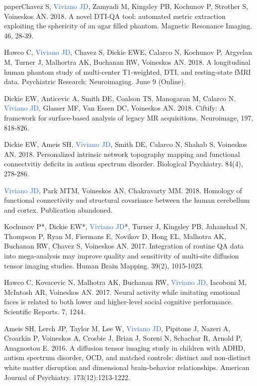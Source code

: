 \documentclass[a4paper,11pt,oneside]{book}
\newcommand\paper[1]{
    #1\\
    \vspace{3.5mm}
}
\begin{document}
\begin{flushleft}
paper{Chavez S, \textcolor{highlight}{Viviano JD}, Zamyadi M, Kingsley PB, Kochunov P, Strother S, Voineskos AN. 2018. A novel DTI-QA tool: automated metric extraction exploiting the sphericity of an agar filled phantom. Magnetic Resonance Imaging. 46, 28-39.}

\paper{Hawco C, \textcolor{highlight}{Viviano JD}, Chavez S, Dickie EWE, Calarco N, Kochunov P, Argyelan M, Turner J, Malhortra AK, Buchanan RW, Voineskos AN. 2018. A longitudinal human phantom study of multi-center T1-weighted, DTI, and resting-state fMRI data. Psychiatric Research: Neuroimaging. June 9 (Online).}

\paper{Dickie EW, Anticevic A, Smith DE, Coalson TS, Manogaran M, Calarco N, \textcolor{highlight}{Viviano JD}, Glasser MF, Van Essen DC, Voineskos AN. 2018. Ciftify: A framework for surface-based analysis of legacy MR acquisitions. Neuroimage, 197, 818-826.}

\paper{Dickie EW, Ameis SH, \textcolor{highlight}{Viviano JD}, Smith DE, Calarco N, Shahab S, Voineskos AN. 2018. Personalized intrinsic network topography mapping and functional connectvitiy deficits in autism spectrum disorder. Biological Psychiatry. 84(4), 278-286.}

\paper{\textcolor{highlight}{Viviano JD}, Park MTM, Voineskos AN, Chakravarty MM. 2018. Homology of functional connectivity and structural covariance between the human cerebellum and cortex. Publication abandoned.}

\paper{Kochunov P*, Dickie EW*, \textcolor{highlight}{Viviano JD}*, Turner J, Kingsley PB, Jahanshad N, Thompson P, Ryan M, Fiermans E, Novikov D, Hong EL, Malhotra AK, Buchanan RW, Chavez S, Voineskos AN. 2017. Integration of routine QA data into mega-analysis may improve quality and sensitivity of multi-site diffusion tensor imaging studies. Human Brain Mapping. 39(2), 1015-1023.}

\paper{Hawco C, Kovacevic N, Malhotra AK, Buchanan RW, \textcolor{highlight}{Viviano JD}, Iacoboni M, McIntosh AR, Voineskos AN. 2017. Neural activity while imitating emotional faces is related to both lower and higher-level social cognitive performance. Scientific Reports. 7, 1244.}

\paper{Ameis SH, Lerch JP, Taylor M, Lee W, \textcolor{highlight}{Viviano JD}, Pipitone J, Nazeri A, Croarkin P, Voineskos A, Crosbie J, Brian J, Soreni N, Schachar R, Arnold P, Anagnostou E. 2016. A diffusion tensor imaging study in children with ADHD, autism spectrum disorder, OCD, and matched controls: distinct and non-distinct white matter disruption and dimensional brain-behavior relationships. American Journal of Psychiatry. 173(12):1213-1222.}


\end{flushleft}
\end{document}
